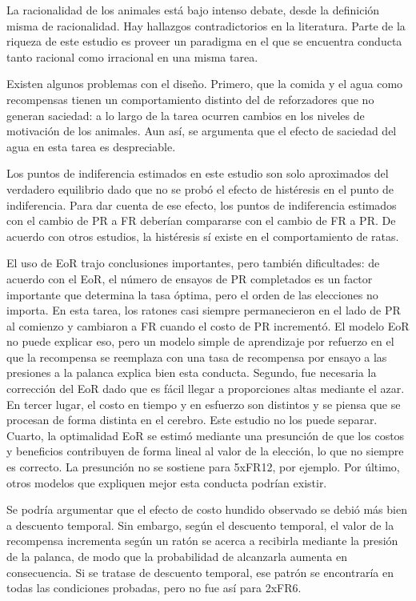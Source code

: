 \documentclass[a4paper,12pt]{article}
\begin{document}
La racionalidad de los animales está bajo intenso debate, desde la definición misma de racionalidad. Hay hallazgos contradictorios en la literatura. Parte de la riqueza de este estudio es proveer un paradigma en el que se encuentra conducta tanto racional como irracional en una misma tarea.

Existen algunos problemas con el diseño. Primero, que la comida y el agua como recompensas tienen un comportamiento distinto del de reforzadores que no generan saciedad: a lo largo de la tarea ocurren cambios en los niveles de motivación de los animales. Aun así, se argumenta que el efecto de saciedad del agua en esta tarea es despreciable.

Los puntos de indiferencia estimados en este estudio son solo aproximados del verdadero equilibrio dado que no se probó el efecto de histéresis en el punto de indiferencia. Para dar cuenta de ese efecto, los puntos de indiferencia estimados con el cambio de PR a FR deberían compararse con el cambio de FR a PR. De acuerdo con otros estudios, la histéresis sí existe en el comportamiento de ratas. 

El uso de EoR trajo conclusiones importantes, pero también dificultades: de acuerdo con el EoR, el número de ensayos de PR completados es un factor importante que determina la tasa óptima, pero el orden de las elecciones no importa. En esta tarea, los ratones casi siempre permanecieron en el lado de PR al comienzo y cambiaron a FR cuando el costo de PR incrementó. El modelo EoR no puede explicar eso, pero un modelo simple de aprendizaje por refuerzo en el que la recompensa se reemplaza con una tasa de recompensa por ensayo a las presiones a la palanca explica bien esta conducta. Segundo, fue necesaria la corrección del EoR dado que es fácil llegar a proporciones altas mediante el azar. En tercer lugar, el costo en tiempo y en esfuerzo son distintos y se piensa que se procesan de forma distinta en el cerebro. Este estudio no los puede separar. Cuarto, la optimalidad EoR se estimó mediante una presunción de que los costos y beneficios contribuyen de forma lineal al valor de la elección, lo que no siempre es correcto. La presunción no se sostiene para 5xFR12, por ejemplo. Por último, otros modelos que expliquen mejor esta conducta podrían existir. 

Se podría argumentar que el efecto de costo hundido observado se debió más bien a descuento temporal. Sin embargo, según el descuento temporal, el valor de la recompensa incrementa según un ratón se acerca a recibirla mediante la presión de la palanca, de modo que la probabilidad de alcanzarla aumenta en consecuencia. Si se tratase de descuento temporal, ese patrón se encontraría en todas las condiciones probadas, pero no fue así para 2xFR6.
\end{document}
